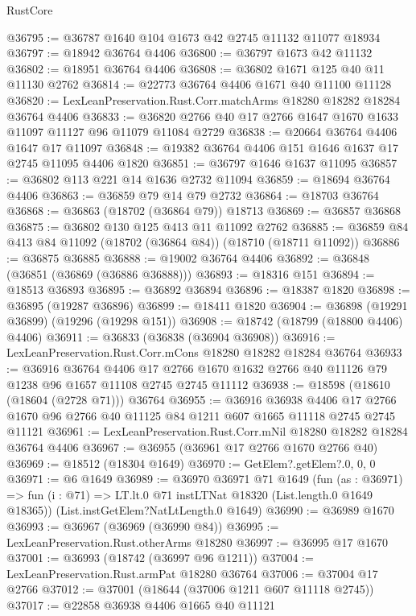 \begin{lexlean}{RustCore}
\begin{coremodule}
@36795 := @36787 @1640 @104 @1673 @42 @2745 @11132 @11077 @18934
@36797 := @18942 @36764 @4406
@36800 := @36797 @1673 @42 @11132
@36802 := @18951 @36764 @4406
@36808 := @36802 @1671 @125 @40 @11 @11130 @2762
@36814 := @22773 @36764 @4406 @1671 @40 @11100 @11128
@36820 := LexLeanPreservation.Rust.Corr.matchArms @18280 @18282 @18284 @36764 @4406
@36833 := @36820 @2766 @40 @17 @2766 @1647 @1670 @1633 @11097 @11127 @96 @11079 @11084 @2729
@36838 := @20664 @36764 @4406 @1647 @17 @11097
@36848 := @19382 @36764 @4406 @151 @1646 @1637 @17 @2745 @11095 @4406 @1820
@36851 := @36797 @1646 @1637 @11095
@36857 := @36802 @113 @221 @14 @1636 @2732 @11094
@36859 := @18694 @36764 @4406
@36863 := @36859 @79 @14 @79 @2732
@36864 := @18703 @36764
@36868 := @36863 (@18702 (@36864 @79)) @18713
@36869 := @36857 @36868
@36875 := @36802 @130 @125 @413 @11 @11092 @2762
@36885 := @36859 @84 @413 @84 @11092 (@18702 (@36864 @84)) (@18710 (@18711 @11092))
@36886 := @36875 @36885
@36888 := @19002 @36764 @4406
@36892 := @36848 (@36851 (@36869 (@36886 @36888)))
@36893 := @18316 @151
@36894 := @18513 @36893
@36895 := @36892 @36894
@36896 := @18387 @1820
@36898 := @36895 (@19287 @36896)
@36899 := @18411 @1820
@36904 := @36898 (@19291 @36899) (@19296 (@19298 @151))
@36908 := @18742 (@18799 (@18800 @4406) @4406)
@36911 := @36833 (@36838 (@36904 @36908))
@36916 := LexLeanPreservation.Rust.Corr.mCons @18280 @18282 @18284 @36764
@36933 := @36916
    @36764
    @4406
    @17
    @2766
    @1670
    @1632
    @2766
    @40
    @11126
    @79
    @1238
    @96
    @1657
    @11108
    @2745
    @2745
    @11112
@36938 := @18598 (@18610 (@18604 (@2728 @71))) @36764
@36955 := @36916
    @36938
    @4406
    @17
    @2766
    @1670
    @96
    @2766
    @40
    @11125
    @84
    @1211
    @607
    @1665
    @11118
    @2745
    @2745
    @11121
@36961 := LexLeanPreservation.Rust.Corr.mNil @18280 @18282 @18284 @36764 @4406
@36967 := @36955 (@36961 @17 @2766 @1670 @2766 @40)
@36969 := @18512 (@18304 @1649)
@36970 := GetElem?.getElem?.{0, 0, 0}
@36971 := @6 @1649
@36989 := @36970
    @36971
    @71
    @1649
    (fun (as : @36971) =>
    fun (i : @71) => LT.lt.{0} @71 instLTNat @18320 (List.length.{0} @1649 @18365))
    (List.instGetElem?NatLtLength.{0} @1649)
@36990 := @36989 @1670
@36993 := @36967 (@36969 (@36990 @84))
@36995 := LexLeanPreservation.Rust.otherArms @18280
@36997 := @36995 @17 @1670
@37001 := @36993 (@18742 (@36997 @96 @1211))
@37004 := LexLeanPreservation.Rust.armPat @18280 @36764
@37006 := @37004 @17 @2766
@37012 := @37001 (@18644 (@37006 @1211 @607 @11118 @2745))
@37017 := @22858 @36938 @4406 @1665 @40 @11121

\end{coremodule}
\end{lexlean}
